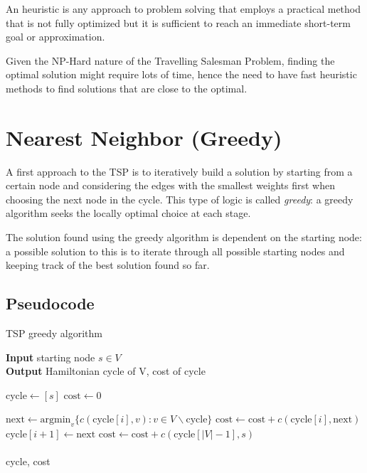 An heuristic is any approach to problem solving that employs a practical method that is not fully optimized but it is sufficient to reach an immediate short-term goal or approximation.

Given the NP-Hard nature of the Travelling Salesman Problem, finding the optimal solution might require lots of time, hence the need to have fast heuristic methods to find solutions that are close to the optimal.

\section{Nearest Neighbor (Greedy)}

A first approach to the TSP is to iteratively build a solution by starting from a certain node and considering the edges with the smallest weights first when choosing the next node in the cycle. This type of logic is called \textit{greedy}: a greedy algorithm seeks the locally optimal choice at each stage.

The solution found using the greedy algorithm is dependent on the starting node: a possible solution to this is to iterate through all possible starting nodes and keeping track of the best solution found so far.

\newpage

\subsection{Pseudocode}
\begin{algorithm}[h]
    \caption{TSP greedy algorithm}

    \textbf{Input} starting node $s\in V$\\
    \textbf{Output} Hamiltonian cycle of V, cost of cycle\\
    \begin{algorithmic}

        \State $\mbox{cycle} \gets [s]$
        \State $\mbox{cost} \gets 0$
        
            \State $\mbox{next}\gets\mbox{argmin}_v\{c(\mbox{cycle}[i],v) : v\in V \smallsetminus \mbox{cycle}\}$
            \State $\mbox{cost}\gets\mbox{cost}+c(\mbox{cycle}[i], \mbox{next})$
            \State $\mbox{cycle}[i+1]\gets\mbox{next}$
        \EndFor
        \State $\mbox{cost}\gets\mbox{cost}+c(\mbox{cycle}[|V|-1],s)$\\\\
        \Return cycle, cost
    \end{algorithmic}
\end{algorithm}

